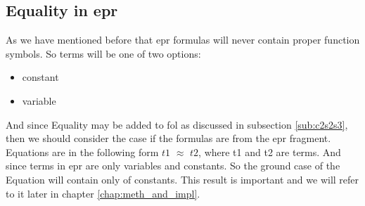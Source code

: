 \subsection{Equality in \ac{epr}}\label{sub:c2s2s4}
As we have mentioned before that \ac{epr} formulas will never contain proper function symbols. So terms will be one of two options:
\begin{itemize}
	\item constant
	\item variable
\end{itemize}


And since Equality may be added to \ac{fol} as discussed in subsection \ref{sub:c2s2s3}, then we should consider the case if the formulas are from the \ac{epr} fragment. Equations are in the following form $t1$ $\approx$ $t2$, where t1 and t2 are terms. And since terms in \ac{epr} are only variables and constants. So the ground case of the Equation will contain only of constants. This result is important and we will refer to it later in chapter \ref{chap:meth_and_impl}.
 
